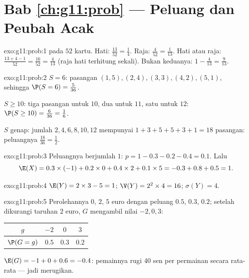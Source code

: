 \section*{Bab \ref{ch:g11:prob} --- Peluang dan Peubah Acak}

\begin{solution}{exo:g11:prob:1}
 pada $52$ kartu. Hati: $\frac{13}{52} = \frac14$. Raja:
$\frac{4}{52} = \frac{1}{13}$. Hati atau raja:
$\frac{13 + 4 - 1}{52} = \frac{16}{52} = \frac{4}{13}$ (raja hati
terhitung sekali). Bukan keduanya: $1 - \frac{4}{13} = \frac{9}{13}$.
\end{solution}

\begin{solution}{exo:g11:prob:2}
$S = 6$: pasangan $(1,5), (2,4), (3,3), (4,2), (5,1)$, sehingga
$\P(S = 6) = \frac{5}{36}$.

$S \geq 10$: tiga pasangan untuk $10$, dua untuk $11$, satu untuk $12$:
$\P(S \geq 10) = \frac{6}{36} = \frac16$.

$S$ genap: jumlah $2, 4, 6, 8, 10, 12$ mempunyai $1 + 3 + 5 + 5 + 3 + 1 = 18$
pasangan: peluangnya $\frac{18}{36} = \frac12$.
\end{solution}

\begin{solution}{exo:g11:prob:3}
Peluangnya berjumlah $1$: $p = 1 - 0.3 - 0.2 - 0.4 = 0.1$. Lalu
\[
\E(X) = 0.3 \times (-1) + 0.2 \times 0 + 0.4 \times 2 + 0.1 \times 5
= -0.3 + 0.8 + 0.5 = 1 .
\]
\end{solution}

\begin{solution}{exo:g11:prob:4}
$\E(Y) = 2 \times 3 - 5 = 1$; $\V(Y) = 2^2 \times 4 = 16$;
$\sigma(Y) = 4$.
\end{solution}

\begin{solution}{exo:g11:prob:5}
Perolehannya $0$, $2$, $5$ euro dengan peluang $0.5$, $0.3$,
$0.2$; setelah dikurangi taruhan $2$ euro, $G$ mengambil nilai $-2, 0, 3$:
\begin{center}
\begin{tabular}{c|ccc}
$g$ & $-2$ & $0$ & $3$\\
\hline
$\P(G=g)$ & $0.5$ & $0.3$ & $0.2$
\end{tabular}
\end{center}
$\E(G) = -1 + 0 + 0.6 = -0.4$: pemainnya rugi $40$ sen per permainan secara
rata-rata --- jadi merugikan.
\end{solution}


